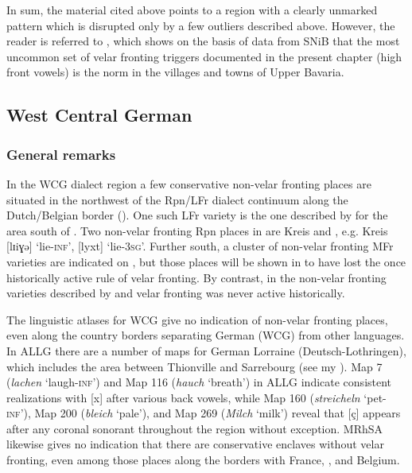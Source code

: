 In sum, the material cited above points to a region with a clearly unmarked pattern which is disrupted only by a few outliers described above. However, the reader is referred to , which shows on the basis of data from SNiB that the most uncommon set of velar fronting triggers documented in the present chapter (high front vowels) is the norm in the villages and towns of Upper Bavaria.

\subsection{West Central German}\label{sec:12.3.4}
\subsubsection{General remarks}
In the WCG dialect region a few conservative non-velar fronting places are situated in the northwest of the Rpn/LFr dialect continuum along the Dutch/Belgian border (). One such LFr variety is the one described by \citet{Ramisch1908} for the area south of . Two non-velar fronting Rpn places in  are Kreis  \citep{Welter1929} and  \citep{Welter1933}, e.g. Kreis  [lɪiɣə] ‘lie-\textsc{inf}’, [lyxt] ‘lie-\textsc{3sg}’. Further south, a cluster of non-velar fronting MFr varieties are indicated on , but those places will be shown in  to have lost the once historically active rule of velar fronting. By contrast, in the non-velar fronting varieties described by \citet{Ramisch1908} and \citet{Welter1929,Welter1933} velar fronting was never active historically.

The linguistic atlases for WCG give no indication of non-velar fronting places, even along the country borders separating German (WCG) from other languages. In ALLG there are a number of maps for German Lorraine (Deutsch-Lothringen), which includes the area between Thionville and Sarrebourg (see my ). Map 7 (\textit{lachen} ‘laugh-\textsc{inf}’) and Map 116 (\textit{hauch} ‘breath’) in ALLG indicate consistent realizations with [x] after various back vowels, while Map 160 (\textit{streicheln} ‘pet-\textsc{inf}’), Map 200 (\textit{bleich} ‘pale’), and Map 269 (\textit{Milch} ‘milk’) reveal that [ç] appears after any coronal sonorant throughout the region without exception. MRhSA likewise gives no indication that there are conservative enclaves without velar fronting, even among those places along the borders with France, , and Belgium.

